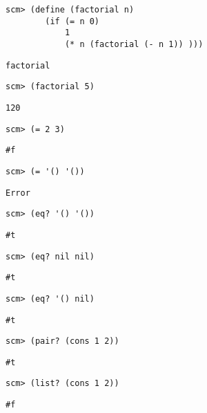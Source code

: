 \begin{blocksection}
\begin{lstlisting}
scm> (define (factorial n)
        (if (= n 0)
            1
            (* n (factorial (- n 1)) )))
\end{lstlisting}
\begin{solution}[.25in]
\texttt{factorial}
\end{solution}

\begin{lstlisting}
scm> (factorial 5)
\end{lstlisting}
\begin{solution}[.25in]
\texttt{120}
\end{solution}

\begin{lstlisting}
scm> (= 2 3)
\end{lstlisting}
\begin{solution}[.25in]
\texttt{\#f}
\end{solution}

\begin{lstlisting}
scm> (= '() '())
\end{lstlisting}
\begin{solution}[.25in]
\texttt{Error}
\end{solution}

\begin{lstlisting}
scm> (eq? '() '())
\end{lstlisting}
\begin{solution}[.25in]
\texttt{\#t}
\end{solution}

\begin{lstlisting}
scm> (eq? nil nil)
\end{lstlisting}
\begin{solution}[.25in]
\texttt{\#t}
\end{solution}

\begin{lstlisting}
scm> (eq? '() nil)
\end{lstlisting}
\begin{solution}[.25in]
\texttt{\#t}
\end{solution}

\begin{lstlisting}
scm> (pair? (cons 1 2))
\end{lstlisting}
\begin{solution}[.25in]
\texttt{\#t}
\end{solution}

\begin{lstlisting}
scm> (list? (cons 1 2))
\end{lstlisting}
\begin{solution}[.25in]
\texttt{\#f}
\end{solution}
\end{blocksection}
